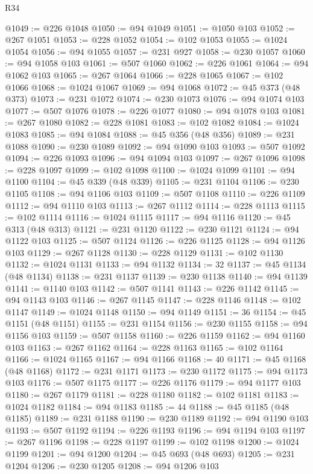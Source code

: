 \begin{lexlean}{R34}
\begin{coremodule}
@1049 := @226 @1048
@1050 := @94 @1049
@1051 := @1050 @103
@1052 := @267 @1051
@1053 := @228 @1052
@1054 := @102 @1053
@1055 := @1024 @1054
@1056 := @94 @1055
@1057 := @231 @927
@1058 := @230 @1057
@1060 := @94 @1058 @103
@1061 := @507 @1060
@1062 := @226 @1061
@1064 := @94 @1062 @103
@1065 := @267 @1064
@1066 := @228 @1065
@1067 := @102 @1066
@1068 := @1024 @1067
@1069 := @94 @1068
@1072 := @45 @373 (@48 @373)
@1073 := @231 @1072
@1074 := @230 @1073
@1076 := @94 @1074 @103
@1077 := @507 @1076
@1078 := @226 @1077
@1080 := @94 @1078 @103
@1081 := @267 @1080
@1082 := @228 @1081
@1083 := @102 @1082
@1084 := @1024 @1083
@1085 := @94 @1084
@1088 := @45 @356 (@48 @356)
@1089 := @231 @1088
@1090 := @230 @1089
@1092 := @94 @1090 @103
@1093 := @507 @1092
@1094 := @226 @1093
@1096 := @94 @1094 @103
@1097 := @267 @1096
@1098 := @228 @1097
@1099 := @102 @1098
@1100 := @1024 @1099
@1101 := @94 @1100
@1104 := @45 @339 (@48 @339)
@1105 := @231 @1104
@1106 := @230 @1105
@1108 := @94 @1106 @103
@1109 := @507 @1108
@1110 := @226 @1109
@1112 := @94 @1110 @103
@1113 := @267 @1112
@1114 := @228 @1113
@1115 := @102 @1114
@1116 := @1024 @1115
@1117 := @94 @1116
@1120 := @45 @313 (@48 @313)
@1121 := @231 @1120
@1122 := @230 @1121
@1124 := @94 @1122 @103
@1125 := @507 @1124
@1126 := @226 @1125
@1128 := @94 @1126 @103
@1129 := @267 @1128
@1130 := @228 @1129
@1131 := @102 @1130
@1132 := @1024 @1131
@1133 := @94 @1132
@1134 := 32
@1137 := @45 @1134 (@48 @1134)
@1138 := @231 @1137
@1139 := @230 @1138
@1140 := @94 @1139
@1141 := @1140 @103
@1142 := @507 @1141
@1143 := @226 @1142
@1145 := @94 @1143 @103
@1146 := @267 @1145
@1147 := @228 @1146
@1148 := @102 @1147
@1149 := @1024 @1148
@1150 := @94 @1149
@1151 := 36
@1154 := @45 @1151 (@48 @1151)
@1155 := @231 @1154
@1156 := @230 @1155
@1158 := @94 @1156 @103
@1159 := @507 @1158
@1160 := @226 @1159
@1162 := @94 @1160 @103
@1163 := @267 @1162
@1164 := @228 @1163
@1165 := @102 @1164
@1166 := @1024 @1165
@1167 := @94 @1166
@1168 := 40
@1171 := @45 @1168 (@48 @1168)
@1172 := @231 @1171
@1173 := @230 @1172
@1175 := @94 @1173 @103
@1176 := @507 @1175
@1177 := @226 @1176
@1179 := @94 @1177 @103
@1180 := @267 @1179
@1181 := @228 @1180
@1182 := @102 @1181
@1183 := @1024 @1182
@1184 := @94 @1183
@1185 := 44
@1188 := @45 @1185 (@48 @1185)
@1189 := @231 @1188
@1190 := @230 @1189
@1192 := @94 @1190 @103
@1193 := @507 @1192
@1194 := @226 @1193
@1196 := @94 @1194 @103
@1197 := @267 @1196
@1198 := @228 @1197
@1199 := @102 @1198
@1200 := @1024 @1199
@1201 := @94 @1200
@1204 := @45 @693 (@48 @693)
@1205 := @231 @1204
@1206 := @230 @1205
@1208 := @94 @1206 @103

\end{coremodule}
\end{lexlean}
